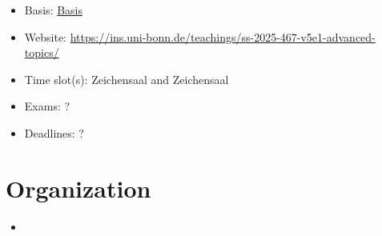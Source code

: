 \begin{tcolorbox}[enhanced,breakable,
	title=General Information,frame style={color=mycolor}]
    \begin{itemize}
        \item Basis: \href{https://basis.uni-bonn.de/qisserver/rds?state=verpublish&status=init&vmfile=no&publishid=256365&moduleCall=webInfo&publishConfFile=webInfo&publishSubDir=veranstaltung}{Basis}
        \item Website: \href{https://ins.uni-bonn.de/teachings/ss-2025-467-v5e1-advanced-topics/}{https://ins.uni-bonn.de/teachings/ss-2025-467-v5e1-advanced-topics/}
        \item Time slot(s):  Zeichensaal and  Zeichensaal
        \item Exams: ?
        \item Deadlines: ?
    \end{itemize}
\end{tcolorbox}

\section{Organization}

\begin{itemize}
    \item 
\end{itemize}
 

